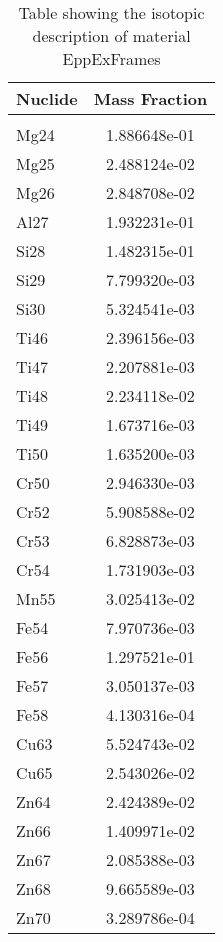 \begin{centering}
\begin{table}[ht!]
\begin{tabular}{l | c}
\hline
Nuclide & Mass Fraction\\
\hline
\\
Mg24 & 1.886648e-01\\
Mg25 & 2.488124e-02\\
Mg26 & 2.848708e-02\\
Al27 & 1.932231e-01\\
Si28 & 1.482315e-01\\
Si29 & 7.799320e-03\\
Si30 & 5.324541e-03\\
Ti46 & 2.396156e-03\\
Ti47 & 2.207881e-03\\
Ti48 & 2.234118e-02\\
Ti49 & 1.673716e-03\\
Ti50 & 1.635200e-03\\
Cr50 & 2.946330e-03\\
Cr52 & 5.908588e-02\\
Cr53 & 6.828873e-03\\
Cr54 & 1.731903e-03\\
Mn55 & 3.025413e-02\\
Fe54 & 7.970736e-03\\
Fe56 & 1.297521e-01\\
Fe57 & 3.050137e-03\\
Fe58 & 4.130316e-04\\
Cu63 & 5.524743e-02\\
Cu65 & 2.543026e-02\\
Zn64 & 2.424389e-02\\
Zn66 & 1.409971e-02\\
Zn67 & 2.085388e-03\\
Zn68 & 9.665589e-03\\
Zn70 & 3.289786e-04
\end{tabular}
\caption{Table showing the isotopic description of material EppExFrames}
\label{table:material_EppExFrames}
\end{table}\clearpage


\end{centering}
